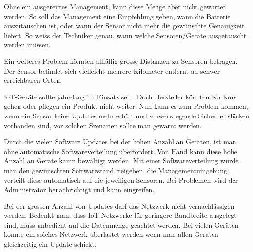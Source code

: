 Ohne ein ausgereiftes Management, kann diese Menge aber nicht gewartet werden. So soll das Management eine Empfehlung geben, wann die Batterie auszutauschen ist, oder wann der Sensor nicht mehr die gewünschte Genauigkeit liefert. So weiss der Techniker genau, wann welche Sensoren/Geräte ausgetauscht werden müssen.

Ein weiteres Problem könnten allfällig grosse Distanzen zu Sensoren betragen. Der Sensor befindet sich vielleicht mehrere Kilometer entfernt an schwer erreichbaren Orten.

IoT-Geräte sollte jahrelang im Einsatz sein. Doch Hersteller könnten Konkurs gehen oder pflegen ein Produkt nicht weiter. Nun kann es zum Problem kommen, wenn ein Sensor keine Updates mehr erhält und schwerwiegende Sicherheitslücken vorhanden sind, vor solchen Szenarien sollte man gewarnt werden. 

Durch die vielen Software Updates bei der hohen Anzahl an Geräten, ist man ohne automatische Softwareverteilung überfordert. Von Hand kann diese hohe Anzahl an Geräte kaum bewältigt werden. Mit einer Softwareverteilung würde man den gewünschten Softwarestand freigeben, die Managementumgebung verteilt diese automatisch auf die jeweiligen Sensoren. Bei Problemen wird der Administrator benachrichtigt und kann eingreifen.

Bei der grossen Anzahl von Updates darf das Netzwerk nicht vernachlässigen werden. Bedenkt man, dass IoT-Netzwerke für geringere Bandbreite ausgelegt sind, muss unbedient auf die Datenmenge geachtet werden. Bei vielen Geräten könnte ein solches Netzwerk überlastet werden wenn man allen Geräten gleichzeitig ein Update schickt.

